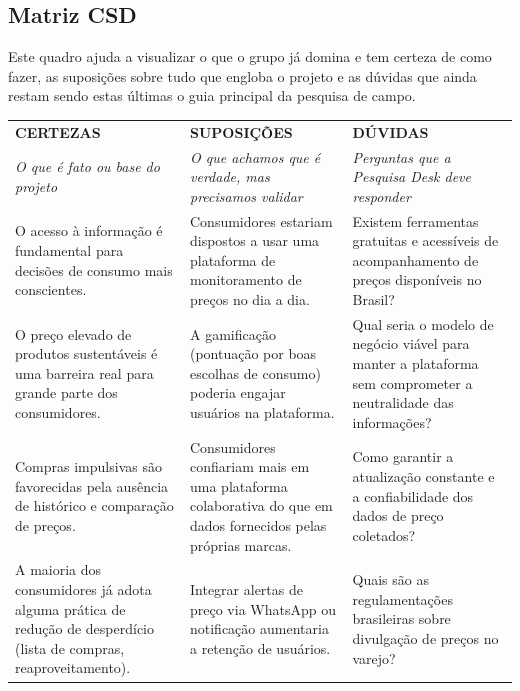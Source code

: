 \documentclass[12pt, a4paper]{article}
\begin{document}
\subsection{Matriz CSD}

Este quadro ajuda a visualizar o que o grupo já domina e tem certeza de como fazer, as suposições sobre tudo que engloba o projeto e as dúvidas que ainda restam \textemdash{} sendo estas últimas o guia principal da pesquisa de campo.

\renewcommand{\arraystretch}{1.4}
\begingroup
\small
\begin{xltabular}{\textwidth}{!{\color{wineSoft}\vrule}X!{\color{wineSoft}\vrule}X!{\color{wineSoft}\vrule}X!{\color{wineSoft}\vrule}}
\hline
{}\\ \hline
{}
\centering\textbf{CERTEZAS} & \centering\textbf{SUPOSIÇÕES} & \centering\arraybackslash\textbf{DÚVIDAS} \\
\centering\footnotesize\textit{O que é fato ou base do projeto} & \centering\footnotesize\textit{O que achamos que é verdade, mas precisamos validar} & \centering\arraybackslash\footnotesize\textit{Perguntas que a Pesquisa Desk deve responder} \\ \hline
\endhead
O acesso à informação é fundamental para decisões de consumo mais conscientes.
& Consumidores estariam dispostos a usar uma plataforma de monitoramento de preços no dia a dia.
& Existem ferramentas gratuitas e acessíveis de acompanhamento de preços disponíveis no Brasil? \\ \hline
O preço elevado de produtos sustentáveis é uma barreira real para grande parte dos consumidores.
& A gamificação (pontuação por boas escolhas de consumo) poderia engajar usuários na plataforma.
& Qual seria o modelo de negócio viável para manter a plataforma sem comprometer a neutralidade das informações? \\ \hline
Compras impulsivas são favorecidas pela ausência de histórico e comparação de preços.
& Consumidores confiariam mais em uma plataforma colaborativa do que em dados fornecidos pelas próprias marcas.
& Como garantir a atualização constante e a confiabilidade dos dados de preço coletados? \\ \hline
A maioria dos consumidores já adota alguma prática de redução de desperdício (lista de compras, reaproveitamento).
& Integrar alertas de preço via WhatsApp ou notificação aumentaria a retenção de usuários.
& Quais são as regulamentações brasileiras sobre divulgação de preços no varejo? \\ \hline
\end{xltabular}
\endgroup
\end{document}
